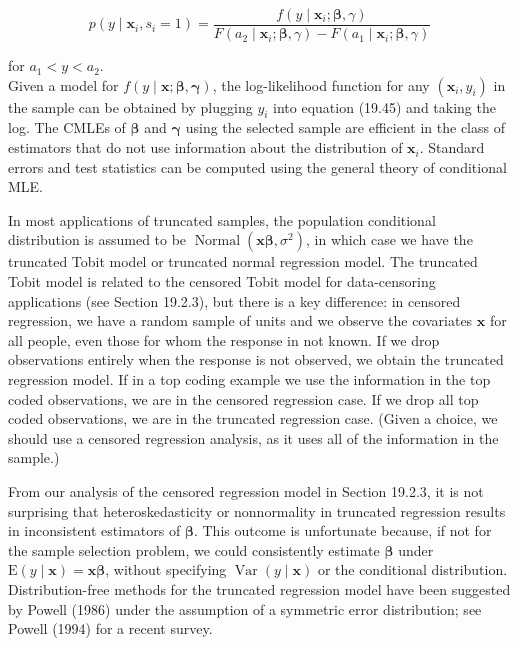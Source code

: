 \documentclass[10pt]{article}
\begin{document}
\begin{equation*}
p\left(y \mid \mathbf{x}_{i}, s_{i}=1\right)=\frac{f\left(y \mid \mathbf{x}_{i} ; \boldsymbol{\beta}, \gamma\right)}{F\left(a_{2} \mid \mathbf{x}_{i} ; \boldsymbol{\beta}, \gamma\right)-F\left(a_{1} \mid \mathbf{x}_{i} ; \boldsymbol{\beta}, \gamma\right)} \tag{19.45}
\end{equation*}


for $a_{1}<y<a_{2}$.\\
Given a model for $f(y \mid \mathbf{x} ; \boldsymbol{\beta}, \boldsymbol{\gamma})$, the log-likelihood function for any $\left(\mathbf{x}_{i}, y_{i}\right)$ in the sample can be obtained by plugging $y_{i}$ into equation (19.45) and taking the log. The CMLEs of $\boldsymbol{\beta}$ and $\boldsymbol{\gamma}$ using the selected sample are efficient in the class of estimators that do not use information about the distribution of $\mathbf{x}_{i}$. Standard errors and test statistics can be computed using the general theory of conditional MLE.

In most applications of truncated samples, the population conditional distribution is assumed to be $\operatorname{Normal}\left(\mathbf{x} \boldsymbol{\beta}, \sigma^{2}\right)$, in which case we have the truncated Tobit model or truncated normal regression model. The truncated Tobit model is related to the censored Tobit model for data-censoring applications (see Section 19.2.3), but there is a key difference: in censored regression, we have a random sample of units and we observe the covariates $\mathbf{x}$ for all people, even those for whom the response in not known. If we drop observations entirely when the response is not observed, we obtain the truncated regression model. If in a top coding example we use the information in the top coded observations, we are in the censored regression case. If we drop all top coded observations, we are in the truncated regression case. (Given a choice, we should use a censored regression analysis, as it uses all of the information in the sample.)

From our analysis of the censored regression model in Section 19.2.3, it is not surprising that heteroskedasticity or nonnormality in truncated regression results in inconsistent estimators of $\boldsymbol{\beta}$. This outcome is unfortunate because, if not for the sample selection problem, we could consistently estimate $\boldsymbol{\beta}$ under $\mathrm{E}(y \mid \mathbf{x})=\mathbf{x} \boldsymbol{\beta}$, without specifying $\operatorname{Var}(y \mid \mathbf{x})$ or the conditional distribution. Distribution-free methods for the truncated regression model have been suggested by Powell (1986) under the assumption of a symmetric error distribution; see Powell (1994) for a recent survey.
\end{document}
